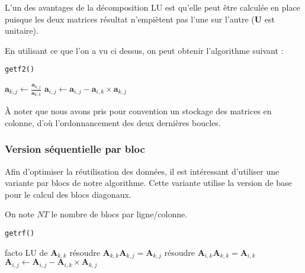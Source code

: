 L'un des avantages de la décomposition LU est qu'elle peut être calculée en place puisque les deux matrices résultat n'empiètent pas l'une sur l'autre ($\mathbf{U}$ est unitaire).

En utilisant ce que l'on a vu ci dessus, on peut obtenir l'algorithme suivant :

\begin{algorithm}
\caption*{\texttt{getf2()}}
\begin{algorithmic}
        \State$\mathbf{a}_{k,j}\gets \frac{\mathbf{a}_{k,j}}{\mathbf{a}_{k,k}}$
    \EndFor
            \State$\mathbf{a}_{i,j}\gets \mathbf{a}_{i,j} - \mathbf{a}_{i,k}\times \mathbf{a}_{k,j}$
        \EndFor
    \EndFor
\EndFor
\end{algorithmic}
\end{algorithm}

À noter que nous avons pris pour convention un stockage des matrices en colonne, d'où l'ordonnancement des deux dernières boucles.

\subsubsection{Version séquentielle par bloc}

Afin d'optimiser la réutilisation des données, il est intéressant d'utiliser une variante par blocs de notre algorithme. Cette variante utilise la version de base pour le calcul des blocs diagonaux.

On note $NT$ le nombre de blocs par ligne/colonne.

\begin{algorithm}
\caption*{\texttt{getrf()}}
\begin{algorithmic}
    \State facto LU de $\mathbf{A}_{k,k}$
        \State résoudre $\mathbf{A}_{k,k}\mathbf{A}_{k,j} = \mathbf{A}_{k,j}$
    \EndFor
            \State résoudre $\mathbf{A}_{i,k}\mathbf{A}_{k,k} = \mathbf{A}_{i,k}$
    \EndFor
            \State$\mathbf{A}_{i,j}\gets \mathbf{A}_{i,j} - \mathbf{A}_{i,k}\times \mathbf{A}_{k,j}$
        \EndFor
    \EndFor
\EndFor
\end{algorithmic}
\end{algorithm}

